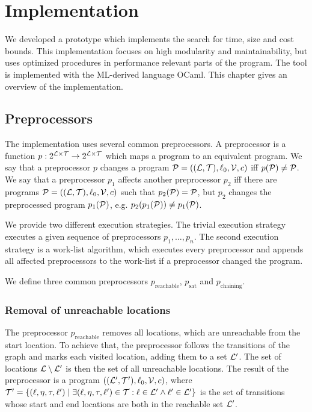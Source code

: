 \section{Implementation}

We developed a prototype which implements the search for time, size and cost bounds.
This implementation focuses on high modularity and maintainability, but uses optimized procedures in performance relevant parts of the program.
The tool is implemented with the ML-derived language OCaml.
This chapter gives an overview of the implementation.

\subsection{Preprocessors}

The implementation uses several common preprocessors.
A preprocessor is a function $p: 2^{\mathcal{L} \times \mathcal{T}} \rightarrow 2^{\mathcal{L} \times \mathcal{T}}$ which maps a program to an equivalent program.
We say that a preprocessor $p$ changes a program $\mathcal{P} = ((\mathcal{L}, \mathcal{T}), \ell_0, \mathcal{V}, c)$ iff $p(\mathcal{P}) \neq \mathcal{P}$.
We say that a preprocessor $p_1$ affects another preprocessor $p_2$ iff there are programs $\mathcal{P} = ((\mathcal{L}, \mathcal{T}), \ell_0, \mathcal{V}, c)$ such that $p_2(\mathcal{P}) = \mathcal{P}$, but $p_2$ changes the preprocessed program $p_1(\mathcal{P})$, e.g. $p_2(p_1(\mathcal{P})) \neq p_1(\mathcal{P})$.

We provide two different execution strategies.
The trivial execution strategy executes a given sequence of preprocessors $p_1, \dots, p_n$.
The second execution strategy is a work-list algorithm, which executes every preprocessor and appends all affected preprocessors to the work-list if a preprocessor changed the program.

We define three common preprocessors $p_{\text{reachable}}$, $p_{\text{sat}}$ and $p_{\text{chaining}}$.

\subsubsection{Removal of unreachable locations}

The preprocessor $p_{\text{reachable}}$ removes all locations, which are unreachable from the start location.
To achieve that, the preprocessor follows the transitions of the graph and marks each visited location, adding them to a set $\mathcal{L}'$.
The set of locations $\mathcal{L} \setminus \mathcal{L}'$ is then the set of all unreachable locations.
The result of the preprocessor is a program $((\mathcal{L}', \mathcal{T}'), \ell_0, \mathcal{V}, c)$, where $\mathcal{T}' = \lbrace (\ell,\eta,\tau,\ell') \mid \exists (\ell,\eta,\tau,\ell') \in \mathcal{T}: \ell \in \mathcal{L}' \wedge \ell' \in \mathcal{L}' \rbrace$ is the set of transitions whose start and end locations are both in the reachable set $\mathcal{L}'$.

